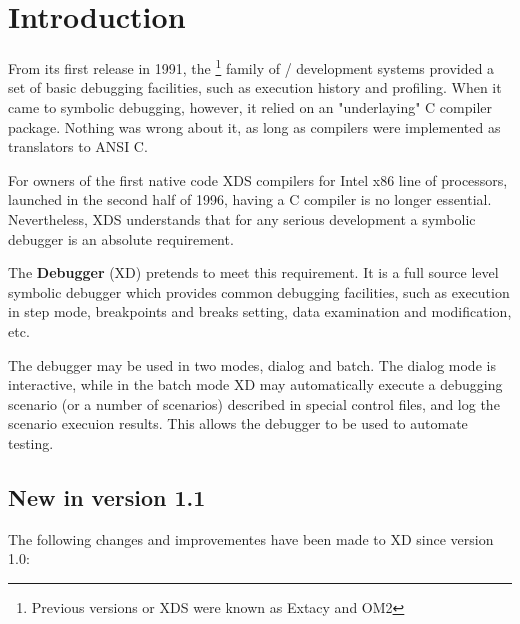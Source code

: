 \chapter{Introduction}

From its first release in 1991, the \XDS{}\footnote{Previous versions or XDS were
known as Extacy and OM2} family of \mt{}/\ot{} development systems
provided a set of basic debugging facilities, such as execution history
and profiling. When it came to symbolic debugging, however, it relied on
an "underlaying" C compiler package. Nothing was wrong about it, as long
as \XDS{} compilers were implemented as translators to ANSI C.

For owners of the first native code XDS compilers for Intel x86 line of
processors, launched in the second half of 1996, having a C compiler
is no longer essential. Nevertheless, XDS understands that for any
serious development a symbolic debugger is an absolute requirement.

The {\bf \XDS{} Debugger} (XD) pretends to meet this requirement. It is
a full source level symbolic debugger which provides common debugging
facilities, such as execution in step mode, breakpoints and breaks setting,
data examination and modification, etc.

The debugger may be used in two modes, dialog and batch. The dialog mode
is interactive, while in the batch mode XD may automatically
execute a debugging scenario (or a number of scenarios) described in
special control files, and log the scenario execuion results.
This allows the debugger to be used to automate testing.

\section{New in version 1.1}

The following changes and improvementes have been made to XD since 
version 1.0:

